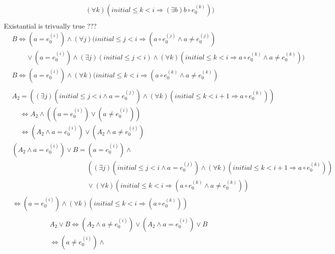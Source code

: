 \documentclass[a4paper,10pt]{article}
\newcommand{\idx}{\ensuremath{i}\xspace}
\newcommand{\idxinitial}{\ensuremath{\mathit{initial}}\xspace}
\newcommand{\at}[1]{{(#1)}}
\newcommand{\impl}{\ensuremath{\Longrightarrow}}
\newenvironment{proof}[1][Proof.]{\begin{trivlist}
\item[\hskip \labelsep {\bfseries #1}]}{\end{trivlist}}
\begin{document}
\begin{proof}
\begin{align*}
    &\phantom{B= (a = e_0^\at{\idx}} 
       (\forall k)(\idxinitial \leq k < \idx \impl (\exists b) b \circ e_0^\at{k})) \\
  \end{align*}
  Existantial is trivually true ??? 
  \begin{align*}
    &B\Leftrightarrow (a = e_0^\at{\idx})  \land (\forall j)(\idxinitial \leq j < \idx \impl (a \circ e_0^\at{j} \land a \neq e_0^\at{j}) \\
    &\phantom{B=} 
       \lor (a = e_0^\at{\idx}) \land (\exists j)(\idxinitial \leq j < \idx ) \land (\forall k)(\idxinitial \leq k < \idx \impl a \circ e_0^\at{k} \land a \neq e_0^\at{k})) \\
    &B\Leftrightarrow (a = e_0^\at{\idx})  \land (\forall k)(\idxinitial \leq k < \idx \impl (a \circ e_0^\at{k} \land a \neq e_0^\at{k}) \\
  \end{align*}
  \begin{align*}
    &A_2= ((\exists j)(\idxinitial \leq j < \idx \land a = e_0^\at{j}) \land (\forall k)(\idxinitial \leq k < \idx+1 \impl a \circ e_0^\at{k})) \\ 
    &\phantom{A_2}\Leftrightarrow A_2 \land ((a = e_0^\at{\idx}) \lor (a \neq e_0^\at{\idx})) \\
    &\phantom{A_2}\Leftrightarrow  (A_2 \land a = e_0^\at{\idx}) \lor (A_2 \land a \neq e_0^\at{\idx})
  \end{align*}
  \begin{align*}
   &(A_2 \land a = e_0^\at{\idx}) \lor B = (a = e_0^\at{\idx}) \land \\
   &\phantom{(A_2 \land a = e_0^\at{\idx}) \lor B =}
      ((\exists j)(\idxinitial \leq j < \idx \land a = e_0^\at{j}) \land (\forall k)(\idxinitial \leq k < \idx+1 \impl a \circ e_0^\at{k})) \\
   &\phantom{(A_2 \land a = e_0^\at{\idx}) \lor B =}
      \lor (\forall k)(\idxinitial \leq k < \idx \impl (a \circ e_0^\at{k} \land a \neq e_0^\at{k}))\\
   &\Leftrightarrow (a = e_0^\at{\idx}) \land (\forall k)(\idxinitial \leq k < \idx \impl (a \circ e_0^\at{k}))\\
  \end{align*}
  \begin{align*}
   &A_2 \lor B \Leftrightarrow (A_2 \land a \neq e_0^\at{\idx}) \lor (A_2 \land a = e_0^\at{\idx}) \lor B\\
   &\Leftrightarrow (a \neq e_0^\at{\idx}) \land \\

\end{align*}
\end{proof}
\end{document}
